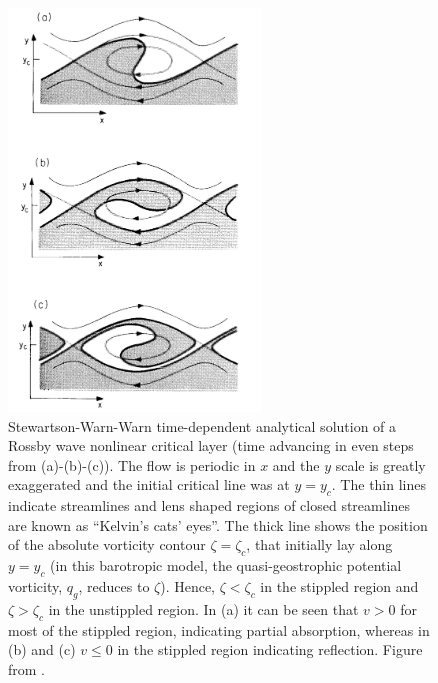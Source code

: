 \begin{figure}
 \centering
 \noindent\includegraphics[width=0.6\textwidth]{figures/chapter-intro/breaking_wave_AHL.pdf}
 \caption[Results from a Stewartson-Warn-Warn model of wave
 breaking.]{Stewartson-Warn-Warn time-dependent analytical solution of a Rossby
   wave nonlinear critical layer (time advancing in even steps from
   (a)-(b)-(c)). The flow is periodic in $x$ and the $y$ scale is greatly
   exaggerated and the initial critical line was at $y=y_c$. The thin lines
   indicate streamlines and lens shaped regions of closed streamlines are known
   as ``Kelvin's cats' eyes''. The thick line shows the position of the absolute
   vorticity contour $\zeta=\zeta_c$, that initially lay along $y=y_c$ (in this
   barotropic model, the quasi-geostrophic potential vorticity, $q_g$, reduces
   to $\zeta$). Hence, $\zeta<\zeta_c$ in the stippled region and
   $\zeta>\zeta_c$ in the unstippled region. In (a) it can be seen that $v>0$
   for most of the stippled region, indicating partial absorption, whereas in
   (b) and (c) $v\leq0$ in the stippled region indicating reflection. Figure
   from \citet{Andrews1987}.}
 \label{fig:cats_eyes}
\end{figure}

